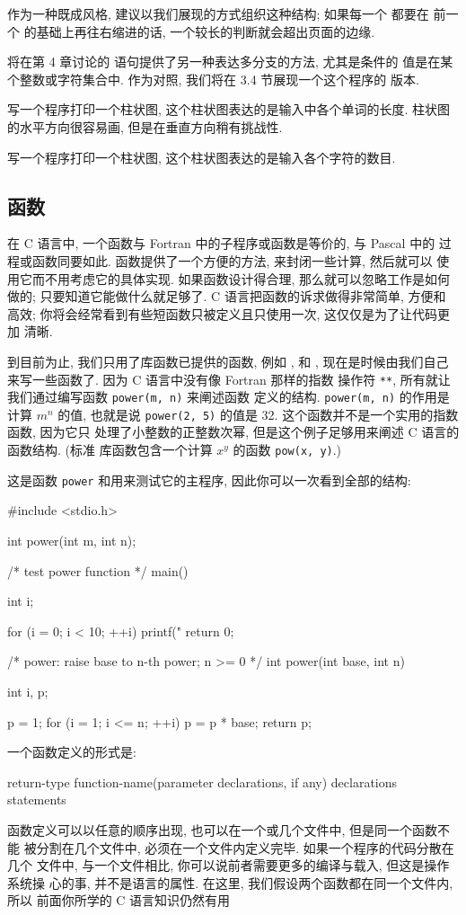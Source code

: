 作为一种既成风格, 建议以我们展现的方式组织这种结构; 如果每一个 \cif 都要在
前一个 \celse 的基础上再往右缩进的话, 一个较长的判断就会超出页面的边缘.

将在第 4 章讨论的 \cswitch 语句提供了另一种表达多分支的方法, 尤其是条件的
值是在某个整数或字符集合中. 作为对照, 我们将在 3.4 节展现一个这个程序的
\cswitch 版本.

\exercise 写一个程序打印一个柱状图, 这个柱状图表达的是输入中各个单词的长度.
柱状图的水平方向很容易画, 但是在垂直方向稍有挑战性.

\exercise 写一个程序打印一个柱状图, 这个柱状图表达的是输入各个字符的数目.

\subsection{函数}
在 C 语言中, 一个函数与 Fortran 中的子程序或函数是等价的, 与 Pascal 中的 
过程或函数同要如此. 函数提供了一个方便的方法, 来封闭一些计算, 然后就可以
使用它而不用考虑它的具体实现. 如果函数设计得合理, 那么就可以忽略工作是如何
做的; 只要知道它能做什么就足够了. C 语言把函数的诉求做得非常简单, 方便和
高效; 你将会经常看到有些短函数只被定义且只使用一次, 这仅仅是为了让代码更加
清晰.

到目前为止, 我们只用了库函数已提供的函数, 例如 \printf, \cgetchar 和 \cputchar,
现在是时候由我们自己来写一些函数了. 因为 C 语言中没有像 Fortran 那样的指数
操作符 \texttt{**}, 所有就让我们通过编写函数 \texttt{power(m, n)} 来阐述函数
定义的结构. \texttt{power(m, n)} 的作用是计算 $m^n$ 的值, 也就是说
\texttt{power(2, 5)} 的值是 32. 这个函数并不是一个实用的指数函数, 因为它只
处理了小整数的正整数次幂, 但是这个例子足够用来阐述 C 语言的函数结构. (标准 
库函数包含一个计算 $x^y$ 的函数 \texttt{pow(x, y)}.)

这是函数 \texttt{power} 和用来测试它的主程序, 因此你可以一次看到全部的结构:
\begin{myverbatim}
    #include <stdio.h>

    int power(int m, int n);

    /* test power function */
    main()
    {
        int i;

        for (i = 0; i < 10; ++i)
            printf("%
        return 0;
    }

    /* power: raise base to n-th power; n >= 0 */
    int power(int base, int n)
    {
        int i, p;

        p = 1;
        for (i = 1; i <= n; ++i)
            p = p * base;
        return p;
    }
\end{myverbatim}
一个函数定义的形式是:
\begin{myverbatim}
    return-type function-name(parameter declarations, if any)
    {
        declarations
        statements
    }
\end{myverbatim}
函数定义可以以任意的顺序出现, 也可以在一个或几个文件中, 但是同一个函数不能
被分割在几个文件中, 必须在一个文件内定义完毕. 如果一个程序的代码分散在几个
文件中, 与一个文件相比, 你可以说前者需要更多的编译与载入, 但这是操作系统操
心的事, 并不是语言的属性. 在这里, 我们假设两个函数都在同一个文件内, 所以 
前面你所学的 C 语言知识仍然有用

